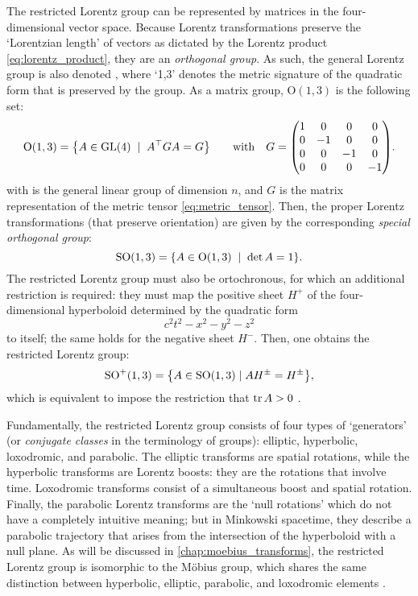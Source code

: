 The restricted Lorentz group can be represented by matrices in the four-dimensional vector space. Because Lorentz transformations preserve the `Lorentzian length' of vectors as dictated by the Lorentz product \cref{eq:lorentz_product}, they are an \emph{orthogonal group}. As such, the general Lorentz group is also denoted , where `1,3' denotes the metric signature of the quadratic form that is preserved by the group. As a matrix group, $\text{O}(1,3)$ is the following set: \cite{Baker1967}
$$ \text{O}(1, 3) = \qty{A \in \text{GL}(4)\;\mid\;A^\top G A = G} \qquad \text{with}\quad G = \mqty(\dmat[0]{1,-1,-1,-1}). $$
with  is the general linear group of dimension $n$, and $G$ is the matrix representation of the metric tensor \cref{eq:metric_tensor}. Then, the proper Lorentz transformations (that preserve orientation) are given by the corresponding \emph{special orthogonal group}:
$$ \text{SO}(1, 3) = \qty{A \in \text{O}(1, 3)\;\mid\;\det A = 1}.$$
The restricted Lorentz group must also be ortochronous, for which an additional restriction is required: they must map the positive sheet $H^+$ of the four-dimensional hyperboloid determined by the quadratic form 
$$ c^2t^2 - x^2 - y^2 - z^2 $$
to itself; the same holds for the negative sheet $H^-$. Then, one obtains the restricted Lorentz group: \cite{Baker1967}
$$ \text{SO}^+(1, 3) = \qty{A \in \text{SO}(1, 3) \mid AH^{\pm} = H^{\pm}}, $$
which is equivalent to impose the restriction that $\trace A > 0$ \cite{Balazs1986}.

Fundamentally, the restricted Lorentz group consists of four types of `generators' (or \emph{conjugate classes} in the terminology of groups): elliptic, hyperbolic, loxodromic, and parabolic. The elliptic transforms are spatial rotations, while the hyperbolic transforms are Lorentz boosts: they are the rotations that involve time. Loxodromic transforms consist of a simultaneous boost and spatial rotation. Finally, the parabolic Lorentz transforms are the `null rotations' which do not have a completely intuitive meaning; but in Minkowski spacetime, they describe a parabolic trajectory that arises from the intersection of the hyperboloid with a null plane. As will be discussed in \cref{chap:moebius_transforms}, the restricted Lorentz group is isomorphic to the Möbius group, which shares the same distinction between hyperbolic, elliptic, parabolic, and loxodromic elements \cite{Needham2021}.

